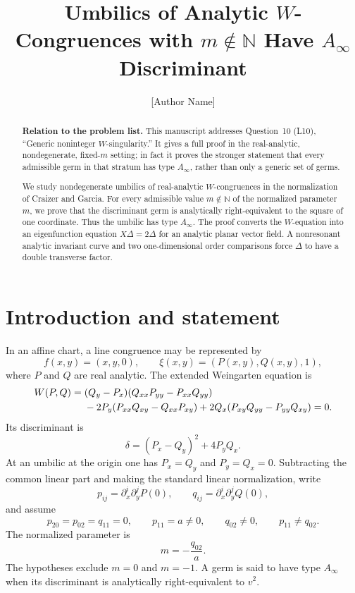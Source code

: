 \documentclass[11pt]{article}
\title{Umbilics of Analytic $W$-Congruences with
\texorpdfstring{$m\notin\mathbb N$}{m not in N}
Have \texorpdfstring{$A_\infty$}{A-infinity} Discriminant}
\author{[Author Name]}
\date{}
\theoremstyle{remark}
\begin{document}
\maketitle

\begin{abstract}
\textbf{Relation to the problem list.}
This manuscript addresses Question~10 (L10), ``Generic noninteger
$W$-singularity.''  It gives a full proof in the real-analytic,
nondegenerate, fixed-$m$ setting; in fact it proves the stronger statement
that every admissible germ in that stratum has type $A_\infty$, rather than
only a generic set of germs.

We study nondegenerate umbilics of real-analytic $W$-congruences in the
normalization of Craizer and Garcia.  For every admissible value
$m\notin\mathbb N$
of the normalized parameter $m$, we prove that the discriminant germ is
analytically right-equivalent to the square of one coordinate.  Thus the
umbilic has type $A_\infty$.  The proof converts the $W$-equation into an
eigenfunction equation $X\Delta=2\Delta$ for an analytic planar vector
field.  A nonresonant analytic invariant curve and two one-dimensional
order comparisons force $\Delta$ to have a double transverse factor.
\end{abstract}

\section{Introduction and statement}

In an affine chart, a line congruence may be represented by
\[
 f(x,y)=(x,y,0),
 \qquad
 \xi(x,y)=(P(x,y),Q(x,y),1),
\]
where $P$ and $Q$ are real analytic.  The extended Weingarten equation is
\begin{align}
 W(P,Q)={}&(Q_y-P_x)(Q_{xx}P_{yy}-P_{xx}Q_{yy})\notag\\
 &-2P_y(P_{xx}Q_{xy}-Q_{xx}P_{xy})
 +2Q_x(P_{xy}Q_{yy}-P_{yy}Q_{xy})=0.\label{eq:W}
\end{align}
Its discriminant is
\begin{equation}\label{eq:disc}
 \delta=(P_x-Q_y)^2+4P_yQ_x.
\end{equation}
At an umbilic at the origin one has
$P_x=Q_y$ and $P_y=Q_x=0$.  Subtracting the common linear part and making
the standard linear normalization, write
\[
 p_{ij}=\partial_x^i\partial_y^jP(0),
 \qquad
 q_{ij}=\partial_x^i\partial_y^jQ(0),
\]
and assume
\begin{equation}\label{eq:normalization}
 p_{20}=p_{02}=q_{11}=0,
 \qquad
 p_{11}=a\ne0,
 \qquad
 q_{02}\ne0,
 \qquad
 p_{11}\ne q_{02}.
\end{equation}
The normalized parameter is
\begin{equation}\label{eq:m}
 m=-\frac{q_{02}}{a}.
\end{equation}
The hypotheses exclude $m=0$ and $m=-1$.  A germ is said to have type
$A_\infty$ when its discriminant is analytically right-equivalent to
$v^2$.
\end{document}
